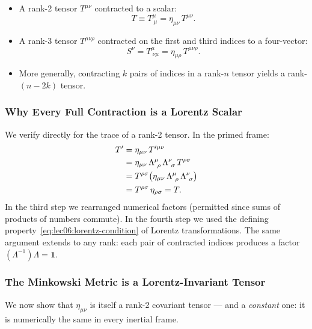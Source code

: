 \begin{itemize}
    \item A rank-2 tensor $T^{\mu\nu}$ contracted to a scalar:
\begin{equation}\label{eq:lec06:trace-rank2}
    T \equiv T^\mu_{\ \mu} = \eta_{\mu\nu}\,T^{\mu\nu} .
\end{equation}
    \item A rank-3 tensor $T^{\mu\nu\rho}$ contracted on the first and third
      indices to a four-vector:
\begin{equation}\label{eq:lec06:contract-rank3}
    S^\nu = T^\mu_{\ \nu\mu} = \eta_{\mu\rho}\,T^{\mu\nu\rho} .
\end{equation}
    \item More generally, contracting $k$ pairs of indices in a rank-$n$
      tensor yields a rank-$(n-2k)$ tensor.
\end{itemize}

\subsubsection*{Why Every Full Contraction is a Lorentz Scalar}

We verify directly for the trace of a rank-2 tensor.  In the primed frame:
\begin{align}
    T'
    &= \eta_{\mu\nu}\,T'^{\mu\nu} \notag \\
    &= \eta_{\mu\nu}\,\Lambda^\mu_{\ \rho}\,\Lambda^\nu_{\ \sigma}\,T^{\rho\sigma} \notag \\
    &= T^{\rho\sigma}\bigl(\eta_{\mu\nu}\,\Lambda^\mu_{\ \rho}\,\Lambda^\nu_{\ \sigma}\bigr) \notag \\
    &= T^{\rho\sigma}\,\eta_{\rho\sigma} = T .
    \label{eq:lec06:scalar-proof}
\end{align}
In the third step we rearranged numerical factors (permitted since sums of
products of numbers commute).  In the fourth step we used the defining
property~\eqref{eq:lec06:lorentz-condition} of Lorentz transformations.
The same argument extends to any rank: each pair of contracted indices
produces a factor $(\Lambda^{-1})\Lambda = \mathbf{1}$.

\subsubsection*{The Minkowski Metric is a Lorentz-Invariant Tensor}

We now show that $\eta_{\mu\nu}$ is itself a rank-2 covariant tensor — and a
\emph{constant} one: it is numerically the same in every inertial frame.

